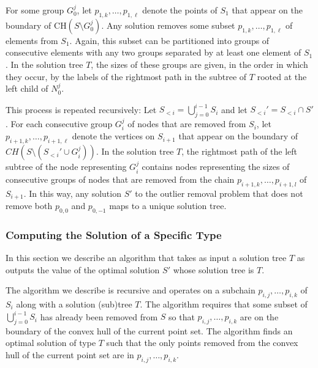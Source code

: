 \documentclass[lotsofwhite]{patmorin}
\newcommand{\ch}{\mathrm{CH}}
\begin{document}
For some group $G_0^j$, let $p_{1,k}, \ldots, p_{1,\ell}$ denote the
points of $S_1$ that appear on the boundary of $\ch(S\setminus
G_0^j)$.  Any solution removes some subset $p_{1,k},\ldots,
p_{1,\ell}$ of elements from $S_1$.  Again, this subset can be
partitioned into groups of consecutive elements with any two groups
separated by at least one element of $S_1$.  In the solution tree $T$,
the sizes of these groups are given, in the order in which they occur,
by the labels of the rightmost path in the subtree of $T$ rooted at
the left child of $N_0^j$.

This process is repeated recursively: Let
$S_{<i}=\bigcup_{j=0}^{i-1}S_i$ and let $S_{<i}'=S_{<i}\cap S'$.  For
each consecutive group $G_i^j$ of nodes that are removed from $S_i$,
let $p_{i+1,k}, \ldots, p_{i+1,\ell}$ denote the vertices on $S_{i+1}$
that appear on the boundary of $CH(S \setminus (S_{<i}'\cup G_i^j))$.
In the solution tree $T$, the rightmost path of the left subtree of
the node representing $G_i^j$ contains nodes representing the sizes of
consecutive groups of nodes that are removed from the chain
$p_{i+1,k}, \ldots, p_{i+1,l}$ of $S_{i+1}$.  In this way, any
solution $S'$ to the outlier removal problem that does not remove both
$p_{0,0}$ and $p_{0,-1}$ maps to a unique solution tree.



\subsubsection{Computing the Solution of a Specific Type}

In this section we describe an algorithm that takes as input a
solution tree $T$ as outputs the value of the optimal solution $S'$
whose solution tree is $T$.

The algorithm we describe is recursive and operates on a subchain
$p_{i,j},\ldots,p_{i,k}$ of $S_i$ along with a solution (sub)tree $T$.  The
algorithm requires that some subset of $\bigcup_{j=0}^{i-1}S_i$ has
already been removed from $S$ so that $p_{i,j},\ldots,p_{i,k}$ are on
the boundary of the convex hull of the current point set.  The
algorithm finds an optimal solution of type $T$ such that the only
points removed from the convex hull of the current point set are in
$p_{i,j},\ldots,p_{i,k}$.
\end{document}
